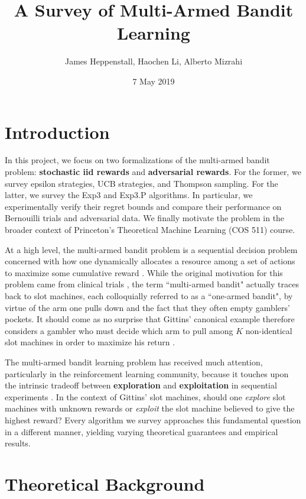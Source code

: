 \documentclass[12pt]{article}
\title{A Survey of Multi-Armed Bandit Learning}
\author{James Heppenstall, Haochen Li, Alberto Mizrahi}
\date{7 May 2019}
\begin{document}
\maketitle

\section{Introduction}

In this project, we focus on two formalizations of the multi-armed bandit problem: \textbf{stochastic iid rewards} and \textbf{adversarial rewards}. For the former, we survey epsilon strategies, UCB strategies, and Thompson sampling. For the latter, we survey the Exp3 and Exp3.P algorithms. In particular, we experimentally verify their regret bounds and compare their performance on Bernouilli trials and adversarial data. We finally motivate the problem in the broader context of Princeton's Theoretical Machine Learning (COS 511) course.

At a high level, the multi-armed bandit problem is a sequential decision problem concerned with how one dynamically allocates a resource among a set of actions to maximize some cumulative reward \cite{robbins1952}. While the original motivation for this problem came from clinical trials \cite{thompson1933}, the term ``multi-armed bandit" actually traces back to slot machines, each colloquially referred to as a ``one-armed bandit", by virtue of the arm one pulls down and the fact that they often empty gamblers' pockets. It should come as no surprise that Gittins' canonical example therefore considers a gambler who must decide which arm to pull among $K$ non-identical slot machines in order to maximize his return \cite{gittins1979}.

The multi-armed bandit learning problem has received much attention, particularly in the reinforcement learning community, because it touches upon the intrinsic tradeoff between \textbf{exploration} and \textbf{exploitation} in sequential experiments \cite{bubeck2012}. In the context of Gittins' slot machines, should one \textit{explore} slot machines with unknown rewards or \textit{exploit} the slot machine believed to give the highest reward? Every algorithm we survey approaches this fundamental question in a different manner, yielding varying theoretical guarantees and empirical results.

\section{Theoretical Background}
\end{document}
